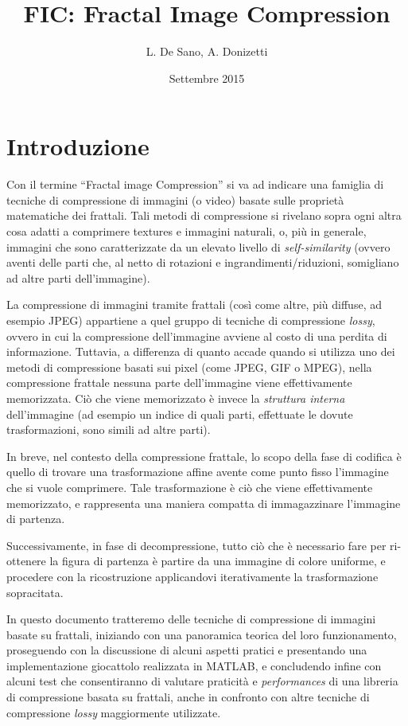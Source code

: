 \documentclass[11pt,a4paper,appendixprefix=true,numbers=noenddot]{scrreprt}
\author{L. De Sano, A. Donizetti}
\title{\textsc{FIC}: Fractal Image Compression}
\date{Settembre 2015}
\begin{document}
\maketitle

\tableofcontents

\chapter{Introduzione}

Con il termine ``Fractal image Compression'' si va ad indicare una famiglia di tecniche di compressione di immagini (o video) basate sulle proprietà matematiche dei frattali\cite{fisher}\cite{barnsley}. Tali metodi di compressione si rivelano sopra ogni altra cosa adatti a comprimere textures e immagini naturali, o, più in generale, immagini che sono caratterizzate da un elevato livello di \emph{self-similarity} (ovvero aventi delle parti che, al netto di rotazioni e ingrandimenti/riduzioni, somigliano ad altre parti dell'immagine).

La compressione di immagini tramite frattali (così come altre, più diffuse, ad esempio JPEG) appartiene a quel gruppo di tecniche di compressione \emph{lossy}, ovvero in cui la compressione dell'immagine avviene al costo di una perdita di informazione. Tuttavia, a differenza di quanto accade quando si utilizza uno dei metodi di compressione basati sui pixel (come JPEG, GIF o MPEG), nella compressione frattale nessuna parte dell'immagine viene effettivamente memorizzata. Ciò che viene memorizzato è invece la \emph{struttura interna} dell'immagine (ad esempio un indice di quali parti, effettuate le dovute trasformazioni, sono simili ad altre parti). 

In breve, nel contesto della compressione frattale, lo scopo della fase di codifica è quello di trovare una trasformazione affine avente come punto fisso l'immagine che si vuole comprimere. Tale trasformazione è ciò che viene effettivamente memorizzato, e rappresenta una maniera compatta di immagazzinare l'immagine di partenza.

Successivamente, in fase di decompressione, tutto ciò che è necessario fare per ri-ottenere la figura di partenza è partire da una immagine di colore uniforme, e procedere con la ricostruzione applicandovi iterativamente la trasformazione sopracitata.

In questo documento tratteremo delle tecniche di compressione di immagini basate su frattali, iniziando con una panoramica teorica del loro funzionamento, proseguendo con la discussione di alcuni aspetti pratici e presentando una implementazione giocattolo realizzata in MATLAB, e concludendo infine con alcuni test che consentiranno di valutare praticità e \emph{performances} di una libreria di compressione basata su frattali, anche in confronto con altre tecniche di compressione \emph{lossy} maggiormente utilizzate.
\end{document}
